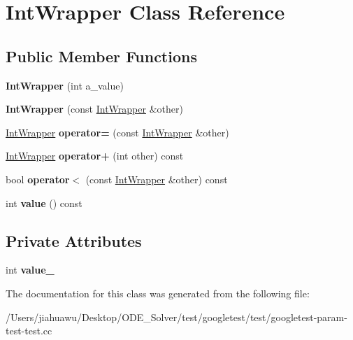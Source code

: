 \hypertarget{class_int_wrapper}{}\section{Int\+Wrapper Class Reference}
\label{class_int_wrapper}
\subsection*{Public Member Functions}
\begin{DoxyCompactItemize}
\item 
\mbox{\label{class_int_wrapper_a1d35e0d0b9c0fc109a8d2a2118ae6010}} 
{\bfseries Int\+Wrapper} (int a\+\_\+value)
\item 
\mbox{\label{class_int_wrapper_af23efe3c8d8bf176948922b41e8f253e}} 
{\bfseries Int\+Wrapper} (const \mbox{\hyperlink{class_int_wrapper}{Int\+Wrapper}} \&other)
\item 
\mbox{\label{class_int_wrapper_a39077b3c0eb1dd8a296a81bfb0a047b3}} 
\mbox{\hyperlink{class_int_wrapper}{Int\+Wrapper}} {\bfseries operator=} (const \mbox{\hyperlink{class_int_wrapper}{Int\+Wrapper}} \&other)
\item 
\mbox{\label{class_int_wrapper_abf97bd11dd2825f3cb9e4d9f48152b56}} 
\mbox{\hyperlink{class_int_wrapper}{Int\+Wrapper}} {\bfseries operator+} (int other) const
\item 
\mbox{\label{class_int_wrapper_a940fd2978cdf7849281f11b32df94163}} 
bool {\bfseries operator$<$} (const \mbox{\hyperlink{class_int_wrapper}{Int\+Wrapper}} \&other) const
\item 
\mbox{\label{class_int_wrapper_a6103e9dc5eb94678985e3c2ac481b508}} 
int {\bfseries value} () const
\end{DoxyCompactItemize}
\subsection*{Private Attributes}
\begin{DoxyCompactItemize}
\item 
\mbox{\label{class_int_wrapper_a9695c22c2bcd5a7bc2775cf6e3a6e33a}} 
int {\bfseries value\+\_\+}
\end{DoxyCompactItemize}


The documentation for this class was generated from the following file\+:\begin{DoxyCompactItemize}
\item 
/\+Users/jiahuawu/\+Desktop/\+O\+D\+E\+\_\+\+Solver/test/googletest/test/googletest-\/param-\/test-\/test.\+cc\end{DoxyCompactItemize}
